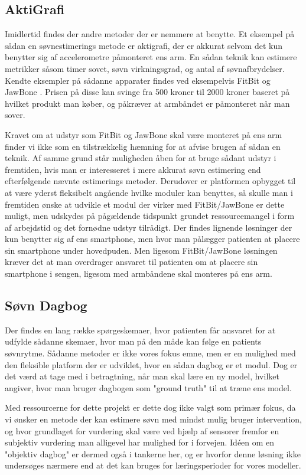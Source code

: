 \subsection{AktiGrafi}
Imidlertid findes der andre metoder der er nemmere at benytte.
Et eksempel på sådan en søvnestimerings metode er aktigrafi, der er akkurat selvom det kun benytter sig af accelerometre påmonteret ens arm.
En sådan teknik kan estimere metrikker såsom timer sovet, søvn virkningsgrad, og antal af søvnafbrydelser.
Kendte eksempler på sådanne apparater findes ved eksempelvis FitBit og JawBone \citep{misc:fitbitSleepTracking,misc:jawBoneSleepTracking}.
Prisen på disse kan svinge fra 500 kroner til 2000 kroner baseret på hvilket produkt man køber, og påkræver at armbåndet er påmonteret når man sover.

Kravet om at udstyr som FitBit og JawBone skal være monteret på ens arm finder vi ikke som en tilstrækkelig hæmning for at afvise brugen af sådan en teknik.
Af samme grund står muligheden åben for at bruge sådant udstyr i fremtiden, hvis man er interesseret i mere akkurat søvn estimering end efterfølgende nævnte estimerings metoder.
Derudover er platformen opbygget til at være yderst fleksibelt angående hvilke moduler kan benyttes, så skulle man i fremtiden ønske at udvikle et modul der virker med FitBit/JawBone er dette muligt, men udskydes på pågældende tidspunkt grundet ressourcemangel i form af arbejdstid og det fornødne udstyr tilrådigt.
Der findes lignende løsninger der kun benytter sig af ens smartphone, men hvor man pålægger patienten at placere sin smartphone under hovedpuden.
Men ligesom FitBit/JawBone løsningen kræver det at man overdrager ansvaret til patienten om at placere sin smartphone i sengen, ligesom med armbåndene skal monteres på ens arm.

\subsection{Søvn Dagbog}
Der findes en lang række spørgeskemaer, hvor patienten får ansvaret for at udfylde sådanne skemaer, hvor man på den måde kan følge en patients søvnrytme.
Sådanne metoder er ikke vores fokus emne, men er en mulighed med den fleksible platform der er udviklet, hvor en sådan dagbog er et modul.
Dog er det værd at tage med i betragtning, når man skal lære en ny model, hvilket \cite{Min:2014:TNT:2556288.2557220} angiver, hvor man bruger dagbogen som "ground truth" til at træne ens model.

Med ressourcerne for dette projekt er dette dog ikke valgt som primær fokus, da vi ønsker en metode der kan estimere søvn med mindst mulig bruger intervention, og hvor grundlaget for vurdering skal være ved hjælp af sensorer fremfor en subjektiv vurdering man alligevel har mulighed for i forvejen.
Idéen om en "objektiv dagbog" er dermed også i tankerne her, og er hvorfor denne løsning ikke undersøges nærmere end at det kan bruges for læringsperioder for vores modeller.

